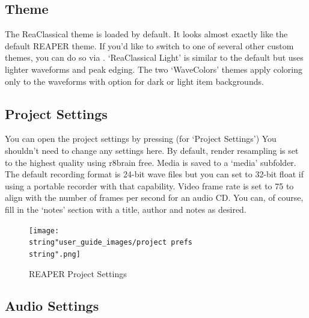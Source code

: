 \documentclass[10pt,american]{article}
\begin{document}
\subsection{Theme}

The ReaClassical theme is loaded by default. It looks almost exactly like the
default REAPER theme. If you'd like to switch to one of several other custom
themes, you can do so via . `ReaClassical Light' is
similar to the default but uses lighter waveforms and peak edging. The two
`WaveColors' themes apply coloring only to the waveforms with option for dark or
light item backgrounds.

\subsection{Project Settings}

You can open the project settings by pressing  (for `Project Settings')
You shouldn't need to change any settings here. By default, render resampling is
set to the highest quality using r8brain free. Media is saved to a `media'
subfolder. The default recording format is 24-bit wave files but you can set to
32-bit float if using a portable recorder with that capability. Video frame rate
is set to 75 to align with the number of frames per second for an audio CD. You
can, of course, fill in the `notes' section with a title, author and notes as
desired.

\begin{figure}
\begin{centering}
\texttt{[image: \\string"user\_guide\_images/project prefs\\string".png]}
\par\end{centering}
\caption{REAPER Project Settings }

\end{figure}


\subsection{Audio Settings}
\end{document}

